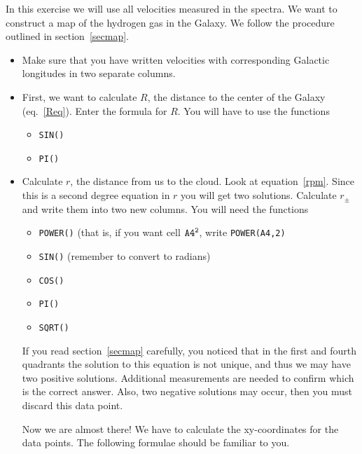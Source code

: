 In this exercise we will use all velocities measured in the spectra. We want
to construct a map of the hydrogen gas in the Galaxy. We follow the
procedure outlined in section~\ref{secmap}.  

\begin{itemize} 

\item
Make sure that you have written velocities with corresponding Galactic
longitudes in two separate columns.  

\item First, we want to calculate
$R$, the distance to the center of the Galaxy (eq.~\ref{Req}). 
Enter the formula for $R$. You will
have to use the functions

\begin{itemize} 
\item {\tt SIN()} 
\item {\tt PI()}
\end{itemize} 

\item Calculate $r$, the distance from us to the
cloud. Look at equation~\ref{rpm}. Since this is a second degree
equation in $r$ you will get two solutions. Calculate $r_{\pm}$ and
write them into two new columns. You will need the functions

\begin{itemize} 

\item{ {\tt POWER()} (that is, if you want cell $\tt A4^2$,
write {\tt POWER(A4,2)}}

\item {{\tt SIN()} (remember to convert to radians) }

\item {\tt COS()}

\item {\tt PI()}

\item{\tt SQRT()}

\end{itemize} 

If you read section~\ref{secmap} carefully, you noticed that in the
first and fourth quadrants the solution to this equation is not
unique, and thus we may have two positive solutions. Additional
measurements are needed to confirm which is the correct answer. Also, 
two negative solutions may occur, then you must discard this data
point.

Now we are almost there! We have to calculate the xy-coordinates for the data points. 
The following formulae should be familiar to you.


\end{itemize}
